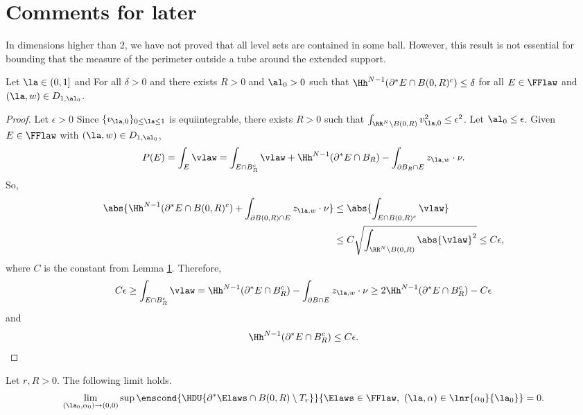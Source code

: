 


\section{Comments for later}

In dimensions higher than 2, we have not proved that all level sets are contained in some ball. However, this result is not essential for bounding that the measure of the perimeter outside a tube around the extended support.

\begin{lem}
Let $\la\in (0,1]$ and 
For all $\delta>0$ and there exists $R>0$ and $\al_0>0$ such that $\Hh^{N-1}(\partial^* E\cap B(0,R)^c)\leq \delta$ for all $E\in \FFlaw$ and $(\la,w)\in D_{1,\al_0}$.
\end{lem}
\begin{proof}
Let $\epsilon>0$
Since $\{v_{\la,0}\}_{0\leq \la\leq 1}$ is equiintegrable, there exists $R>0$ such that $\int_{\RR^N\setminus B(0,R)} v_{\la,0}^2 \leq \epsilon^2$. Let $\al_0\leq \epsilon$. Given $E\in \FFlaw$ with $(\la,w)\in D_{1,\al_0}$,
$$
P(E) = \int_E \vlaw = \int_{E\cap B_R^c} \vlaw + \Hh^{N-1}(\partial^* E \cap B_R) -\int_{\partial B_R \cap E} z_{\la,w}\cdot\nu.
$$
So, \begin{align*}
\abs{\Hh^{N-1}(\partial^* E \cap B(0,R)^c) +\int_{\partial B(0,R) \cap E} z_{\la,w}\cdot\nu}&\leq \abs{\int_{E\cap B(0,R)^c} \vlaw} \\
&\leq C\sqrt{\int_{\RR^N\setminus B(0,R)}\abs{\vlaw}^2}\leq C \epsilon,
\end{align*}
where $C$ is the constant from Lemma \ref{}. Therefore,
$$
C\epsilon \geq \int_{E\cap B_R^c} \vlaw = \Hh^{N-1}(\partial^* E \cap B_R^c) -\int_{\partial B\cap E}z_{\la,w}\cdot \nu \geq 2 \Hh^{N-1}(\partial^* E \cap B_R^c) -C\epsilon
$$
and
$$
\Hh^{N-1}(\partial^* E\cap B_R^c)\leq C\epsilon.
$$
\end{proof} 





\begin{prop}
Let $r, R>0$. The following limit holds.
  \begin{equation}
    \lim_{(\la_0,\alpha_0)\to (0,0)} \sup \enscond{\HDU{\partial^*\Elaws\cap B(0,R) \setminus T_r}}{\Elaws \in \FFlaw,\ (\la,\alpha)\in \lnr{\alpha_0}{\la_0}}=0.
  \end{equation}
\end{prop}


